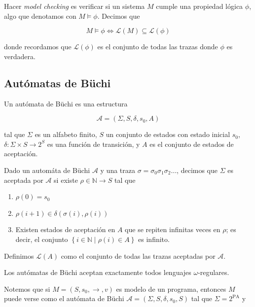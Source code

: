 \documentclass[a4paper, 12pt]{article}
\begin{document}
Hacer \textit{model checking} es verificar si un sistema $M$ cumple una
propiedad lógica $\phi$, algo que denotamos con $M \vDash \phi$. Decimos que 

\begin{equation*}
    M \vDash \phi \iff \mathcal{L}(M) \subseteq \mathcal{L}(\phi)
\end{equation*}

donde recordamos que $\mathcal{L}(\phi)$ es el conjunto de todas las trazas
donde $\phi$ es verdadera.

\subsection*{Autómatas de Büchi}

Un autómata de Büchi es una estructura 

\begin{equation*}
    \mathcal{A} = \left( \Sigma, S, \delta, s_0, A \right) 
\end{equation*}

tal que $\Sigma$ es un alfabeto finito, $S$ un conjunto de estados con estado
inicial $s_0$, $\delta : \Sigma \times S\to 2^S$ es una función de
transición, y $A$ es el conjunto de estados de aceptación.

Dado un automáta de Büchi $\mathcal{A}$ y una traza $\sigma =
\sigma_0\sigma_1\sigma_2\ldots$, decimos que $\Sigma$ es aceptada por
$\mathcal{A}$ si existe $\rho \in \mathbb{N} \to S$ tal que 

\begin{enumerate}
    \item $\rho(0) = s_0$
    \item $\rho(i+1) \in \delta \left( \sigma(i), \rho(i) \right) $
    \item Existen estados de aceptación en $A$ que se repiten infinitas veces en 
        $\rho$; es decir, el conjunto $\left\{ i \in \mathbb{N} \mid \rho(i) \in
        A\right\} $ es infinito.
\end{enumerate}

Definimos $\mathcal{L}(A)$ como el conjunto de todas las trazas aceptadas por
$\mathcal{A}$. 

Los autómatas de Büchi aceptan exactamente todos lenguajes $\omega$-regulares.

Notemos que si $M = (S, s_0, \to, v)$ es modelo de un programa, entonces $M$
puede verse como el autómata de Büchi $\mathcal{A} = (\Sigma, S, \delta, s_0,
S)$ tal que $\Sigma = 2^{\text{PA}}$ y 
\end{document}
